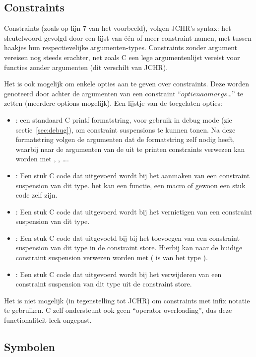 \subsection{Constraints}

Constraints (zoals op lijn 7 van het voorbeeld), volgen JCHR's syntax: het  sleutelwoord gevolgd door een lijst van \'e\'en of meer constraint-namen, met tussen haakjes hun respectievelijke argumenten-types. Constraints zonder argument vereisen nog steeds \code{()} erachter, net zoals C een lege argumentenlijst vereist voor functies zonder argumenten (dit verschilt van JCHR).

Het is ook mogelijk om enkele opties aan te geven over constraints. Deze worden genoteerd door achter de argumenten van een constraint ``$optienaam$\code{,}$args$\ldots\code{)}'' te zetten (meerdere options mogelijk). Een lijstje van de
toegelaten opties: \begin{itemize}
  \item {}: een standaard C printf formatstring, voor gebruik in debug mode (zie sectie~\ref{sec:debug}), om constraint suspensions te kunnen tonen. Na deze formatstring volgen de argumenten dat de formatstring zelf nodig heeft, waarbij naar de argumenten van de uit te printen constraints verwezen kan worden met , , \ldots.
  \item {}: Een stuk C code dat uitgevoerd wordt bij het aanmaken van een constraint suspension van dit type. het kan een functie, een macro of gewoon een stuk code zelf zijn.
  \item {}: Een stuk C code dat uitgevoerd wordt bij het vernietigen van een constraint suspension van dit type. 
  \item {}: Een stuk C code dat uitgevoetd bij bij het toevoegen van een constraint suspension van dit type in de constraint store. Hierbij kan naar de huidige constraint suspension verwezen worden met  ( is van het type ).
  \item {}: Een stuk C code dat uitgevoerd wordt bij het verwijderen van een constraint suspension van dit type uit de constraint store.
\end{itemize}

Het is niet mogelijk (in tegenstelling tot JCHR) om constraints met infix notatie te gebruiken. C zelf ondersteunt ook geen ``operator overloading'', dus deze functionaliteit leek ongepast.

\subsection{Symbolen}

